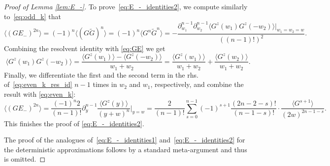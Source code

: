 \documentclass[10pt,a4paper]{amsart}
\begin{document}
\begin{proof}[Proof of Lemma \ref{lem:E_-}]
To prove~\eqref{eq:E_-_identities2}, we compute similarly to~\eqref{eq:odd_k} that
\begin{equation}
\langle (GE_-)^{2n}\rangle = (-1)^n \langle (G\widetilde{G})^n\rangle =(-1)^n \langle G^n\widetilde{G}^n\rangle = -\frac{\partial_{w_1}^{n-1}\partial_{w_2}^{n-1} \langle G^z(w_1)G^z(-w_2)\rangle\big|_{w_1=w_2=w}}{((n-1)!)^2}.
\label{eq:even_k}
\end{equation}
Combining the resolvent identity with \eqref{eq:GE} we get
\begin{equation}
\langle G^z(w_1)G^z(-w_2)\rangle = \frac{\langle G^z(w_1)\rangle - \langle G^z(-w_2)\rangle}{w_1+w_2} = \frac{\langle G^z(w_1)\rangle}{w_1+w_2} + \frac{\langle G^z(w_2)\rangle}{w_1+w_2}.
\label{eq:even_k_res_id}
\end{equation}
Finally, we differentiate the first and the second term in the rhs. of~\eqref{eq:even_k_res_id} $n-1$ times in $w_2$ and $w_1$, respectively, and combine the result with \eqref{eq:even_k}:
\begin{equation*}
\langle (GE_-)^{2n}\rangle = \frac{(-1)^n2}{(n-1)!}\partial_y^{n-1} \frac{\langle G^z(y)\rangle}{(y+w)^n}\big|_{y=w}= \frac{2}{(n-1)!} \sum_{s=0}^{n-1}(-1)^{s+1} \frac{(2n-2-s)!}{(n-1-s)!} \cdot \frac{\langle G^{s+1}\rangle}{(2w)^{2n-1-s}}.
\end{equation*}
This finishes the proof of \eqref{eq:E_-_identities2}.

The proof of the analogues of~\eqref{eq:E_-_identities1} and~\eqref{eq:E_-_identities2} for the deterministic approximations follows by a standard meta-argument and thus is omitted.
\end{proof}
\end{document}
